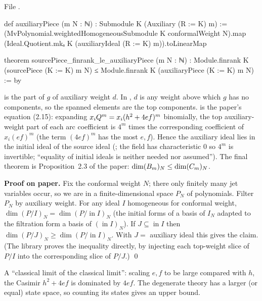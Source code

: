 \noindent File .
\begin{leancode}
def auxiliaryPiece (m N : ℕ) : Submodule K (Auxiliary (R := K) m) :=
  (MvPolynomial.weightedHomogeneousSubmodule K conformalWeight N).map
    (Ideal.Quotient.mkₐ K (auxiliaryIdeal (R := K) m)).toLinearMap

theorem sourcePiece_finrank_le_auxiliaryPiece (m N : ℕ) :
    Module.finrank K (sourcePiece (K := K) m N) ≤
      Module.finrank K (auxiliaryPiece (K := K) m N) := by
\end{leancode}

\begin{dictionary}
 is the part of $g$ of auxiliary weight $d$. In
, $d$ is any weight above which $g$ has no components, so the spanned elements are the top
components.  is the paper's equation (2.15): expanding
$x_iQ^m=x_i(h^2+4ef)^m$ binomially, the top auxiliary-weight part of each arc coefficient is $4^m$ times the
corresponding coefficient of $x_i(ef)^m$ (the term $(4ef)^m$ has the most $e,f$). Hence the auxiliary ideal lies
in the initial ideal of the source ideal (; the field  has
characteristic $0$ so $4^m$ is invertible; ``equality of initial ideals is neither needed nor assumed''). The
final theorem is Proposition~2.3 of the paper: $\dim(B_m)_N\le\dim(C_m)_N$.
\end{dictionary}

\textbf{Proof on paper.} Fix the conformal weight $N$; there only finitely many jet variables occur, so we are in
a finite-dimensional space $P_N$ of polynomials. Filter $P_N$ by auxiliary weight. For any ideal $I$
homogeneous for conformal weight, $\dim(P/I)_N=\dim(P/\operatorname{in}I)_N$ (the initial forms of a basis of
$I_N$ adapted to the filtration form a basis of $(\operatorname{in}I)_N$). If $J\subseteq\operatorname{in}I$ then
$\dim(P/J)_N\ge\dim(P/\operatorname{in}I)_N$. With $J=$ auxiliary ideal this gives the claim. (The library proves
the inequality directly, by injecting each top-weight slice of $P/I$ into the corresponding slice of $P/J$.)
\qed

\begin{physics}
A ``classical limit of the classical limit'': scaling $e,f$ to be large compared with $h$, the Casimir
$h^2+4ef$ is dominated by $4ef$. The degenerate theory has a larger (or equal) state space, so counting its
states gives an upper bound.
\end{physics}

